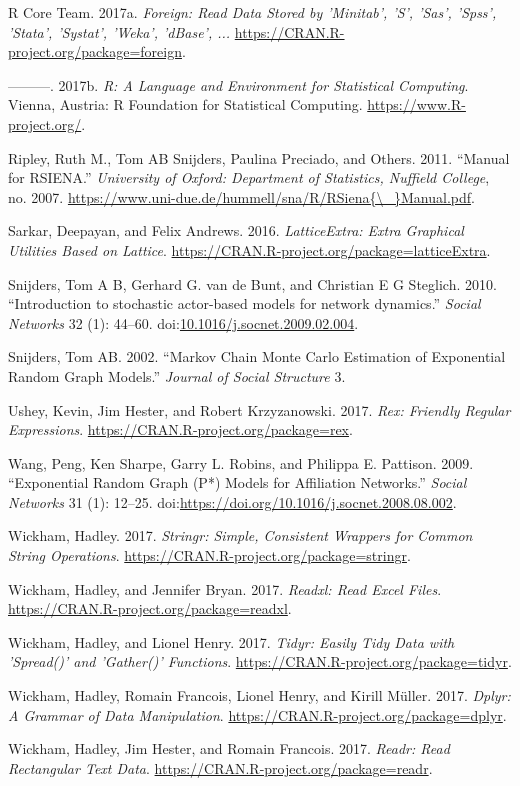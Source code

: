 \documentclass[]{book}
\theoremstyle{definition}
\theoremstyle{definition}
\theoremstyle{definition}
\theoremstyle{remark}
\begin{document}
\hypertarget{ref-R-foreign}{}
R Core Team. 2017a. \emph{Foreign: Read Data Stored by 'Minitab', 'S',
'Sas', 'Spss', 'Stata', 'Systat', 'Weka', 'dBase', ...}
\url{https://CRAN.R-project.org/package=foreign}.

\hypertarget{ref-R}{}
---------. 2017b. \emph{R: A Language and Environment for Statistical
Computing}. Vienna, Austria: R Foundation for Statistical Computing.
\url{https://www.R-project.org/}.

\hypertarget{ref-Ripley2011}{}
Ripley, Ruth M., Tom AB Snijders, Paulina Preciado, and Others. 2011.
``Manual for RSIENA.'' \emph{University of Oxford: Department of
Statistics, Nuffield College}, no. 2007.
\href{https://www.uni-due.de/hummell/sna/R/RSiena\%7B/_\%7DManual.pdf}{https://www.uni-due.de/hummell/sna/R/RSiena\{\textbackslash{}\_\}Manual.pdf}.

\hypertarget{ref-R-latticeExtra}{}
Sarkar, Deepayan, and Felix Andrews. 2016. \emph{LatticeExtra: Extra
Graphical Utilities Based on Lattice}.
\url{https://CRAN.R-project.org/package=latticeExtra}.

\hypertarget{ref-Snijders2010}{}
Snijders, Tom A B, Gerhard G. van de Bunt, and Christian E G Steglich.
2010. ``Introduction to stochastic actor-based models for network
dynamics.'' \emph{Social Networks} 32 (1): 44--60.
doi:\href{https://doi.org/10.1016/j.socnet.2009.02.004}{10.1016/j.socnet.2009.02.004}.

\hypertarget{ref-Snijders2002}{}
Snijders, Tom AB. 2002. ``Markov Chain Monte Carlo Estimation of
Exponential Random Graph Models.'' \emph{Journal of Social Structure} 3.

\hypertarget{ref-R-rex}{}
Ushey, Kevin, Jim Hester, and Robert Krzyzanowski. 2017. \emph{Rex:
Friendly Regular Expressions}.
\url{https://CRAN.R-project.org/package=rex}.

\hypertarget{ref-Wang2009}{}
Wang, Peng, Ken Sharpe, Garry L. Robins, and Philippa E. Pattison. 2009.
``Exponential Random Graph (P*) Models for Affiliation Networks.''
\emph{Social Networks} 31 (1): 12--25.
doi:\href{https://doi.org/https://doi.org/10.1016/j.socnet.2008.08.002}{https://doi.org/10.1016/j.socnet.2008.08.002}.

\hypertarget{ref-R-stringr}{}
Wickham, Hadley. 2017. \emph{Stringr: Simple, Consistent Wrappers for
Common String Operations}.
\url{https://CRAN.R-project.org/package=stringr}.

\hypertarget{ref-R-readxl}{}
Wickham, Hadley, and Jennifer Bryan. 2017. \emph{Readxl: Read Excel
Files}. \url{https://CRAN.R-project.org/package=readxl}.

\hypertarget{ref-R-tidyr}{}
Wickham, Hadley, and Lionel Henry. 2017. \emph{Tidyr: Easily Tidy Data
with 'Spread()' and 'Gather()' Functions}.
\url{https://CRAN.R-project.org/package=tidyr}.

\hypertarget{ref-R-dplyr}{}
Wickham, Hadley, Romain Francois, Lionel Henry, and Kirill Müller. 2017.
\emph{Dplyr: A Grammar of Data Manipulation}.
\url{https://CRAN.R-project.org/package=dplyr}.

\hypertarget{ref-R-readr}{}
Wickham, Hadley, Jim Hester, and Romain Francois. 2017. \emph{Readr:
Read Rectangular Text Data}.
\url{https://CRAN.R-project.org/package=readr}.
\end{document}
